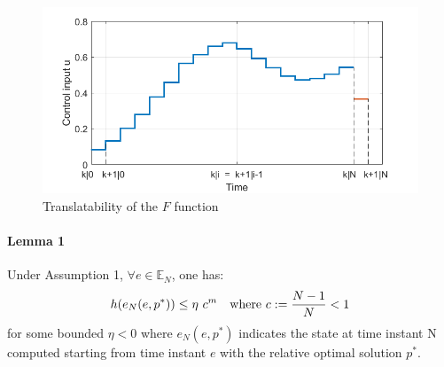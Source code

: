 \begin{figure}[h!]
	\centering
	\includegraphics[scale=0.6]{IMMAGINI/trans_u.png}
	\caption{Translatability of the $F$ function}
	\label{param_translatability}
\end{figure}

\paragraph{Lemma 1} Under Assumption 1, $\forall e \in \mathbb{E}_N$, one has:
\begin{equation}
	h(e_N(e,p^*)) \leq \eta\ c^m\ \ \  \textnormal{where    } c:=\frac{N-1}{N} < 1
 	\label{lemma1}
\end{equation}
for some bounded $\eta < 0$ where $e_N(e,p^*)$ indicates the state at time instant N computed starting from time instant $e$ with the relative optimal solution $p^*$. \\

